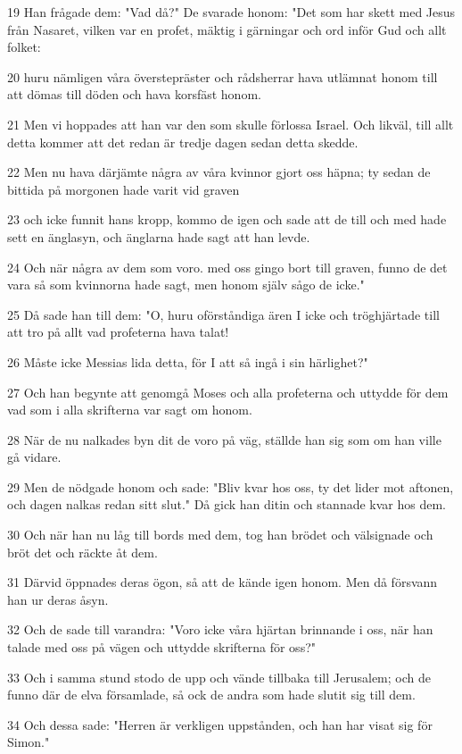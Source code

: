 \par 19 Han frågade dem: "Vad då?" De svarade honom: "Det som har skett med Jesus från Nasaret, vilken var en profet, mäktig i gärningar och ord inför Gud och allt folket:
\par 20 huru nämligen våra överstepräster och rådsherrar hava utlämnat honom till att dömas till döden och hava korsfäst honom.
\par 21 Men vi hoppades att han var den som skulle förlossa Israel. Och likväl, till allt detta kommer att det redan är tredje dagen sedan detta skedde.
\par 22 Men nu hava därjämte några av våra kvinnor gjort oss häpna; ty sedan de bittida på morgonen hade varit vid graven
\par 23 och icke funnit hans kropp, kommo de igen och sade att de till och med hade sett en änglasyn, och änglarna hade sagt att han levde.
\par 24 Och när några av dem som voro. med oss gingo bort till graven, funno de det vara så som kvinnorna hade sagt, men honom själv sågo de icke."
\par 25 Då sade han till dem: "O, huru oförståndiga ären I icke och tröghjärtade till att tro på allt vad profeterna hava talat!
\par 26 Måste icke Messias lida detta, för I att så ingå i sin härlighet?"
\par 27 Och han begynte att genomgå Moses och alla profeterna och uttydde för dem vad som i alla skrifterna var sagt om honom.
\par 28 När de nu nalkades byn dit de voro på väg, ställde han sig som om han ville gå vidare.
\par 29 Men de nödgade honom och sade: "Bliv kvar hos oss, ty det lider mot aftonen, och dagen nalkas redan sitt slut." Då gick han ditin och stannade kvar hos dem.
\par 30 Och när han nu låg till bords med dem, tog han brödet och välsignade och bröt det och räckte åt dem.
\par 31 Därvid öppnades deras ögon, så att de kände igen honom. Men då försvann han ur deras åsyn.
\par 32 Och de sade till varandra: "Voro icke våra hjärtan brinnande i oss, när han talade med oss på vägen och uttydde skrifterna för oss?"
\par 33 Och i samma stund stodo de upp och vände tillbaka till Jerusalem; och de funno där de elva församlade, så ock de andra som hade slutit sig till dem.
\par 34 Och dessa sade: "Herren är verkligen uppstånden, och han har visat sig för Simon."
